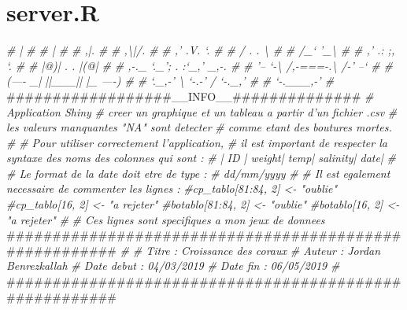 \documentclass[]{report}
\newenvironment{Shaded}{\begin{snugshade}}{\end{snugshade}}
\newcommand{\CommentTok}[1]{\textcolor[rgb]{0.56,0.35,0.01}{\textit{#1}}}
\newcommand{\NormalTok}[1]{#1}
\begin{document}
\section{server.R}\label{server.r}

\begin{Shaded}
\begin{Highlighting}[]
\CommentTok{#                 |                                        #}
\CommentTok{#                 |                                        #}
\CommentTok{#                ,|.                                       #}
\CommentTok{#               ,\textbackslash{}|/.                                      #}
\CommentTok{#             ,' .V. `.                                    #}
\CommentTok{#            / .     . \textbackslash{}                                   #}
\CommentTok{#           /_`       '_\textbackslash{}                                  #}
\CommentTok{#          ,' .:     ;, `.                                 #}
\CommentTok{#          |@)|  . .  |(@|                                 #}
\CommentTok{#     ,-._ `._';  .  :`_,' _,-.                            #}
\CommentTok{#    '--  `-\textbackslash{} /,-===-.\textbackslash{} /-'  --`                           #}
\CommentTok{#   (----  _|  ||___||  |_  ----)                          #}
\CommentTok{#    `._,-'  \textbackslash{}  `-.-'  /  `-._,'                           #}
\CommentTok{#             `-.___,-'                                    #}
\NormalTok{##################__INFO__##############}
\CommentTok{# Application Shiny}
\CommentTok{# creer un graphique et un tableau a partir d'un fichier .csv}
\CommentTok{# les valeurs manquantes "NA" sont detecter}
\CommentTok{#  comme etant des boutures mortes.}
\CommentTok{#}
\CommentTok{# Pour utiliser correctement l'application,}
\CommentTok{# il est important de respecter la syntaxe des noms des colonnes qui sont :}
\CommentTok{# |     ID |     weight|     temp|    salinity|     date|}
\CommentTok{#}
\CommentTok{# Le format de la date doit etre de type :}
\CommentTok{# dd/mm/yyyy}
\CommentTok{#}
\CommentTok{# Il est egalement necessaire de commenter les lignes :}
\CommentTok{#cp_tablo[81:84, 2] <- "oublie"}
\CommentTok{#cp_tablo[16, 2] <- "a rejeter"}
\CommentTok{#botablo[81:84, 2] <- "oublie"}
\CommentTok{#botablo[16, 2] <- "a rejeter"}
\CommentTok{#}
\CommentTok{# Ces lignes sont specifiques a mon jeux de donnees}
\NormalTok{#######################################################}
\CommentTok{#}
\CommentTok{# Titre  : Croissance des coraux}
\CommentTok{# Auteur : Jordan Benrezkallah}
\CommentTok{# Date debut : 04/03/2019}
\CommentTok{# Date fin : 06/05/2019}
\CommentTok{#}
\NormalTok{#######################################################}


\end{Highlighting}
\end{Shaded}
\end{document}
